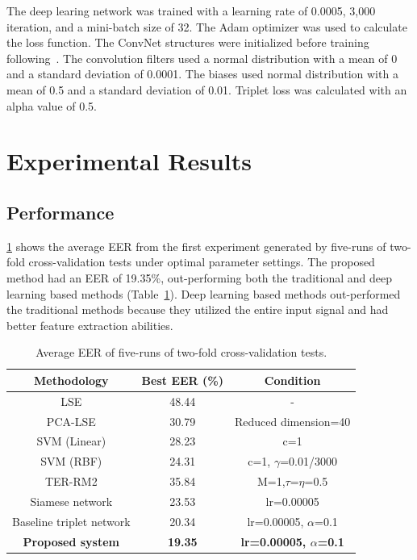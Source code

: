 The deep learing network was trained with a learning rate of 0.0005, 3,000 iteration, and a mini-batch size of 32. The Adam optimizer was used to calculate the loss function. The ConvNet structures were initialized before training following~\cite{koch2015siamese}. The convolution filters used a normal distribution with a mean of 0 and a standard deviation of 0.0001. The biases used normal distribution with a mean of 0.5 and a standard deviation of 0.01. Triplet loss was calculated with an alpha value of 0.5.

\section{Experimental Results}
\subsection{Performance}
\ref{tab_performance} shows the average EER from the first experiment generated by five-runs of two-fold cross-validation tests under optimal parameter settings. The proposed method had an EER of 19.35\%, out-performing both the traditional and deep learning based methods (Table~\ref{tab_performance}).
Deep learning based methods out-performed the traditional methods because they utilized the entire input signal and had better feature extraction abilities.
\begin{table}[!h]
    \caption{Average EER of five-runs of two-fold cross-validation tests.}\label{tab_performance}
    \centering
    \begin{tabular}{|c|c|c|}
    \hline
    Methodology   &   Best EER (\%) &   Condition   \\  \hline
    LSE &   48.44   &  - \\ 
    PCA-LSE    &   30.79   &  Reduced dimension=40    \\
    SVM (Linear) &   28.23   &   c=1 \\
    SVM (RBF)    &   24.31   &   c=1, $\gamma$=0.01/3000 \\
    TER-RM2 &   35.84   &  M=1,$\tau$=$\eta$=0.5   \\     \hline
    Siamese network  &   23.53   &   lr=0.00005  \\
    Baseline triplet network &   20.34   &   lr=0.00005, $\alpha$=0.1  \\
    \textbf{Proposed system} &   \textbf{19.35}   &  \textbf{lr=0.00005, $\alpha$=0.1}  \\
     \hline
    \end{tabular}
\end{table}

